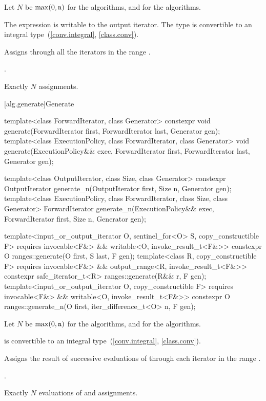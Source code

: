 \begin{itemdescr}
\pnum
Let $N$ be $\max(0, \texttt{n})$ for the  algorithms, and
 for the  algorithms.

\pnum
\mandates
The expression 
is writable to the output iterator.
The type  is convertible
to an integral type~(\ref{conv.integral}, \ref{class.conv}).

\pnum
\effects
Assigns 
through all the iterators in the range .

\pnum
\returns
{}.

\pnum
\complexity
Exactly $N$ assignments.
\end{itemdescr}

[alg.generate]{Generate}

%
%
\begin{itemdecl}
template<class ForwardIterator, class Generator>
  constexpr void generate(ForwardIterator first, ForwardIterator last,
                          Generator gen);
template<class ExecutionPolicy, class ForwardIterator, class Generator>
  void generate(ExecutionPolicy&& exec,
                ForwardIterator first, ForwardIterator last,
                Generator gen);

template<class OutputIterator, class Size, class Generator>
  constexpr OutputIterator generate_n(OutputIterator first, Size n, Generator gen);
template<class ExecutionPolicy, class ForwardIterator, class Size, class Generator>
  ForwardIterator generate_n(ExecutionPolicy&& exec,
                             ForwardIterator first, Size n, Generator gen);

template<input_or_output_iterator O, sentinel_for<O> S, copy_constructible F>
  requires invocable<F&> && writable<O, invoke_result_t<F&>>
  constexpr O ranges::generate(O first, S last, F gen);
template<class R, copy_constructible F>
  requires invocable<F&> && output_range<R, invoke_result_t<F&>>
  constexpr safe_iterator_t<R> ranges::generate(R&& r, F gen);
template<input_or_output_iterator O, copy_constructible F>
  requires invocable<F&> && writable<O, invoke_result_t<F&>>
  constexpr O ranges::generate_n(O first, iter_difference_t<O> n, F gen);
\end{itemdecl}

\begin{itemdescr}
\pnum
Let $N$ be $\max(0, \texttt{n})$ for the  algorithms, and
 for the  algorithms.

\pnum
\mandates
{} is convertible
to an integral type~(\ref{conv.integral}, \ref{class.conv}).

\pnum
\effects
Assigns the result of successive evaluations of 
through each iterator in the range .

\pnum
\returns
{}.

\pnum
\complexity
Exactly $N$ evaluations of  and assignments.
\end{itemdescr}


